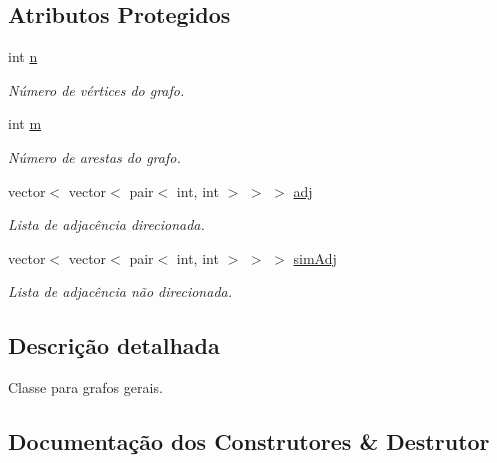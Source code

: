 \subsection*{Atributos Protegidos}
\begin{DoxyCompactItemize}
\item 
\mbox{\label{classGraphGen_af0087a36d5f72076ae87b0f9022c0033}} 
int \hyperlink{classGraphGen_af0087a36d5f72076ae87b0f9022c0033}{n}
\begin{DoxyCompactList}\small\item\em Número de vértices do grafo. \end{DoxyCompactList}\item 
\mbox{\label{classGraphGen_aa313851fc05ee0f7a2ce768ba296e944}} 
int \hyperlink{classGraphGen_aa313851fc05ee0f7a2ce768ba296e944}{m}
\begin{DoxyCompactList}\small\item\em Número de arestas do grafo. \end{DoxyCompactList}\item 
\mbox{\label{classGraphGen_ae1cc2cf59230c1cdff45fa6848f1bf1f}} 
vector$<$ vector$<$ pair$<$ int, int $>$ $>$ $>$ \hyperlink{classGraphGen_ae1cc2cf59230c1cdff45fa6848f1bf1f}{adj}
\begin{DoxyCompactList}\small\item\em Lista de adjacência direcionada. \end{DoxyCompactList}\item 
\mbox{\label{classGraphGen_a6bfecbfc2aca704e5107dd667a23a1c0}} 
vector$<$ vector$<$ pair$<$ int, int $>$ $>$ $>$ \hyperlink{classGraphGen_a6bfecbfc2aca704e5107dd667a23a1c0}{sim\+Adj}
\begin{DoxyCompactList}\small\item\em Lista de adjacência não direcionada. \end{DoxyCompactList}\end{DoxyCompactItemize}


\subsection{Descrição detalhada}
Classe para grafos gerais. 

\subsection{Documentação dos Construtores \& Destrutor}
\mbox{\label{classGraphGen_aec08708894158ba3098873e7a1da6b60}} 
